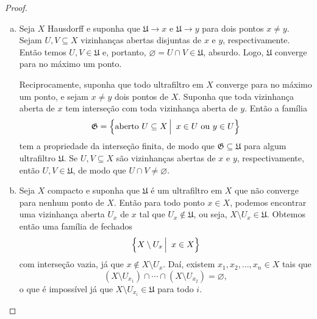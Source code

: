  \begin{proof}
 \begin{enumerate}[(a)]
     \item Seja 
     $X$
     Hausdorff e suponha que
     $\mathfrak{U} \to x$
     e
     $\mathfrak{U} \to y$
     para dois pontos
     $x \neq y$.
     Sejam
     $U, V \subseteq X$
     vizinhanças abertas disjuntas de
     $x$
     e
     $y$,
     respectivamente. 
     Então temos
     $U, V \in \mathfrak{U}$
     e, portanto, 
     $\varnothing = U \cap V \in \mathfrak{U}$,
     absurdo.
     Logo,
     $\mathfrak{U}$
     converge para no máximo um ponto.
     
     Reciprocamente, suponha que todo ultrafiltro em
     $X$
     converge para no máximo um ponto, 
     e sejam
     $x \neq y$
     dois pontos de 
     $X$.
     Suponha que toda vizinhança aberta de 
     $x$
     tem interseção com toda vizinhança aberta de
     $y$.
     Então a família
     \begin{equation*}
         \mathfrak{G}
         =
         \setsuchthat{ \text{aberto } U \subseteq X }{ x \in U \text{ ou } y \in U }
     \end{equation*}
     tem a propriedade da interseção finita, de modo que
     $\mathfrak{G} \subseteq \mathfrak{U}$
     para algum ultrafiltro
     $\mathfrak{U}$.
     Se
     $U, V \subseteq X$
     são vizinhanças abertas de
     $x$
     e
     $y$, 
     respectivamente, então
     $U, V \in \mathfrak{U}$,
     de modo que
     $U \cap V \neq \varnothing$.
     
     \item Seja 
     $X$
     compacto e suponha que
     $\mathfrak{U}$
     é um ultrafiltro em
     $X$
     que não converge para nenhum ponto de
     $X$.
     Então para todo ponto
     $x \in X$,
     podemos encontrar uma vizinhança aberta
     $U_x$
     de
     $x$
     tal que
     $U_x \notin \mathfrak{U}$,
     ou seja,
     $X \setminus U_x \in \mathfrak{U}$.
     Obtemos então uma família de fechados
     \begin{equation*}
         \setsuchthat{ X \setminus U_x }{ x \in X }
     \end{equation*}
     com interseção vazia, já que
     $x \notin X \setminus U_x$.
     Daí, existem 
     $x_1, x_2, \dots, x_n \in X$
     tais que
     \begin{equation*}
         (X \setminus U_{x_1}) \cap \cdots \cap (X \setminus U_{x_2}) 
         = 
         \varnothing,
     \end{equation*}
     o que é impossível já que 
     $X \setminus U_{x_i} \in \mathfrak{U}$
     para todo 
     $i$.
     

\end{enumerate}
\end{proof}
